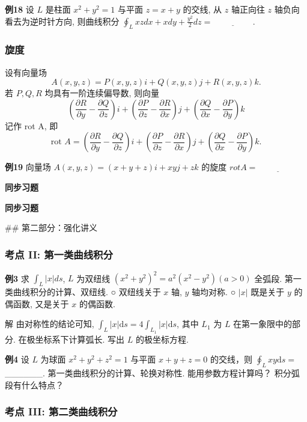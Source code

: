 \textbf{例18} 设 \(L\) 是柱面 \(x^2 + y^2 = 1\) 与平面 \(z = x + y\) 的交线, 从 \(z\) 轴正向往 \(z\) 轴负向看去为逆时针方向, 则曲线积分 \(\oint_L xzdx + xdy + \frac{y^2}{2}dz = \underline{\hspace{2cm}}\).


\subsubsection*{旋度}


设有向量场
\[A(x, y, z) = P(x, y, z)i + Q(x, y, z)j + R(x, y, z)k.\]
若 \(P, Q, R\) 均具有一阶连续偏导数, 则向量
\[ \left(\frac{\partial R}{\partial y} - \frac{\partial Q}{\partial z}\right)i + \left(\frac{\partial P}{\partial z} - \frac{\partial R}{\partial x}\right)j + \left(\frac{\partial Q}{\partial x} - \frac{\partial P}{\partial y}\right)k \]
记作 rot A, 即
\[ \text{rot } A = \left( \frac{\partial R}{\partial y} - \frac{\partial Q}{\partial z} \right) i + \left( \frac{\partial P}{\partial z} - \frac{\partial R}{\partial x} \right) j + \left( \frac{\partial Q}{\partial x} - \frac{\partial P}{\partial y} \right) k. \]

\textbf{例19} 向量场 \(A(x, y, z) = (x + y + z)i + xyj + zk\) 的旋度 \(rot A = \underline{\hspace{2cm}}\)


\medskip
\textbf{同步习题}
\medskip

\medskip
\textbf{同步习题}
\medskip


## 第二部分：强化讲义


\subsubsection*{考点 II: 第一类曲线积分}


\textbf{例3}
求 \(\int_L |x| ds\), \(L\) 为双纽线 \((x^2 + y^2)^2 = a^2(x^2 - y^2)(a > 0)\) 全弧段.
第一类曲线积分的计算、双纽线.
○ 双纽线关于 \(x\) 轴, \(y\) 轴均对称.
○ \(|x|\) 既是关于 \(y\) 的偶函数, 又是关于 \(x\) 的偶函数.

解 由对称性的结论可知, \(\int_{L} |x| \mathrm{d}s = 4 \int_{L_{1}} |x| \mathrm{d}s\), 其中 \(L_{1}\) 为 \(L\) 在第一象限中的部分. 在极坐标系下计算弧长. 写出 \(L\) 的极坐标方程.

\textbf{例4} 设 \(L\) 为球面 \(x^{2} + y^{2} + z^{2} = 1\) 与平面 \(x + y + z = 0\) 的交线，则 \(\oint_{L} x y \mathrm{d}s =\) ______.
第一类曲线积分的计算、轮换对称性.
能用参数方程计算吗？
积分弧段有什么特点？


\subsubsection*{考点 III: 第二类曲线积分}


